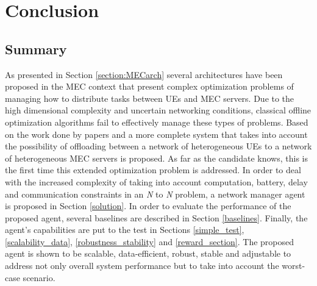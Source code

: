 \documentclass[conference]{IEEEtran}
\begin{document}
\section{Conclusion}
\label{sec:conclusion}

\subsection{Summary}
\noindent As presented in Section \ref{section:MECarch} several architectures have been proposed in the \acrshort{MEC} context that present complex optimization problems of managing how to distribute tasks between \acrshort{UE}s and \acrshort{MEC} servers. Due to the high dimensional complexity and uncertain networking conditions, classical offline optimization algorithms fail to effectively manage these types of problems. Based on the work done by papers \cite{taskclass1} and \cite{NUE1mec} a more complete system that takes into account the possibility of offloading between a network of heterogeneous \acrshort{UE}s to a network of heterogeneous \acrshort{MEC} servers is proposed. As far as the candidate knows, this is the first time this extended optimization problem is addressed. In order to deal with the increased complexity of taking into account computation, battery, delay and communication constraints in an \emph{N} to \emph{N} problem, a network manager agent is proposed in Section \ref{solution}. In order to evaluate the performance of the proposed agent, several baselines are described in Section \ref{baselines}. Finally, the agent's capabilities are put to the test in Sections \ref{simple_test}, \ref{scalability_data}, \ref{robustness_stability} and \ref{reward_section}. The proposed agent is shown to be scalable, data-efficient, robust, stable and adjustable to address not only overall system performance but to take into account the worst-case scenario.
\end{document}
